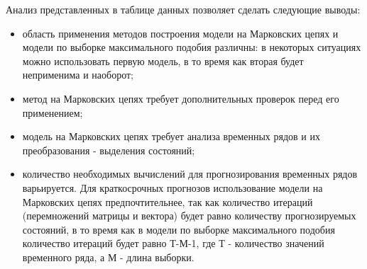 Анализ представленных в таблице данных позволяет сделать
следующие выводы:
\begin{itemize}
    \item область применения методов построения модели на Марковских цепях
и модели по выборке максимального подобия различны: в некоторых
ситуациях можно использовать первую модель, в то время как вторая
будет неприменима и наоборот;
    \item метод на Марковских цепях требует дополнительных проверок перед
его применением;
    \item модель на Марковских цепях требует анализа временных рядов и их
преобразования - выделения состояний;
    \item количество необходимых вычислений для прогнозирования временных
рядов варьируется. Для краткосрочных прогнозов использование
модели на Марковских цепях предпочтительнее, так как количество
итераций (перемножений матрицы и вектора) будет равно количеству
прогнозируемых состояний, в то время как в модели по выборке
максимального подобия количество итераций будет равно Т-М-1, где Т
- количество значений временного ряда, а М - длина выборки.
\end{itemize}